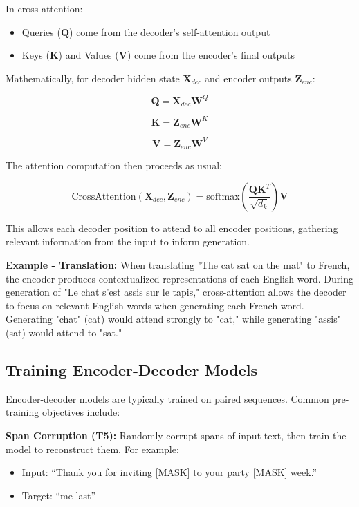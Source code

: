 \documentclass{book}
\begin{document}
In cross-attention:
\begin{itemize}
\item Queries ($\mathbf{Q}$) come from the decoder's self-attention output
\item Keys ($\mathbf{K}$) and Values ($\mathbf{V}$) come from the encoder's final outputs
\end{itemize}

Mathematically, for decoder hidden state $\mathbf{X}_{dec}$ and encoder outputs $\mathbf{Z}_{enc}$:

\begin{equation}
\mathbf{Q} = \mathbf{X}_{dec} \mathbf{W}^Q
\end{equation}

\begin{equation}
\mathbf{K} = \mathbf{Z}_{enc} \mathbf{W}^K
\end{equation}

\begin{equation}
\mathbf{V} = \mathbf{Z}_{enc} \mathbf{W}^V
\end{equation}

The attention computation then proceeds as usual:

\begin{equation}
\text{CrossAttention}(\mathbf{X}_{dec}, \mathbf{Z}_{enc}) = \text{softmax}\left(\frac{\mathbf{Q}\mathbf{K}^T}{\sqrt{d_k}}\right) \mathbf{V}
\end{equation}

This allows each decoder position to attend to all encoder positions, gathering relevant information from the input to inform generation.

\textbf{Example - Translation:} When translating "The cat sat on the mat" to French, the encoder produces contextualized representations of each English word. During generation of "Le chat s'est assis sur le tapis," cross-attention allows the decoder to focus on relevant English words when generating each French word. Generating "chat" (cat) would attend strongly to "cat," while generating "assis" (sat) would attend to "sat."

\subsection{Training Encoder-Decoder Models}

Encoder-decoder models are typically trained on paired sequences. Common pre-training objectives include:

\textbf{Span Corruption (T5):} Randomly corrupt spans of input text, then train the model to reconstruct them. For example:
\begin{itemize}
\item Input: ``Thank you for inviting [MASK] to your party [MASK] week.''
\item Target: ``me last''
\end{itemize}
\end{document}
